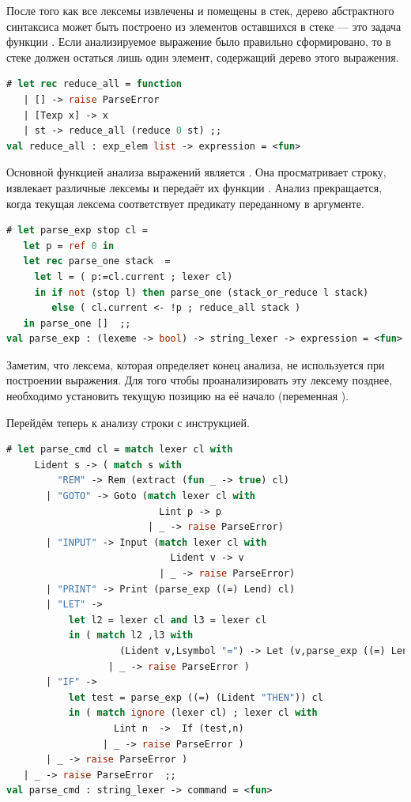 После того как все лексемы извлечены и помещены в стек, дерево абстрактного 
синтаксиса может быть построено из элементов оставшихся в стеке --- это задача 
функции . Если анализируемое выражение было правильно 
сформировано, то в стеке должен остаться лишь один элемент, содержащий дерево 
этого выражения.

\begin{lstlisting}[language=OCaml]
# let rec reduce_all = function
   | [] -> raise ParseError
   | [Texp x] -> x 
   | st -> reduce_all (reduce 0 st) ;;
val reduce_all : exp_elem list -> expression = <fun>
\end{lstlisting}

Основной функцией анализа выражений является . Она 
просматривает строку, извлекает различные лексемы и передаёт их функции 
. Анализ прекращается, когда текущая лексема 
соответствует предикату переданному в аргументе.

\begin{lstlisting}[language=OCaml]
# let parse_exp stop cl = 
   let p = ref 0 in 
   let rec parse_one stack  = 
     let l = ( p:=cl.current ; lexer cl)
     in if not (stop l) then parse_one (stack_or_reduce l stack)
        else ( cl.current <- !p ; reduce_all stack )
   in parse_one []  ;;
val parse_exp : (lexeme -> bool) -> string_lexer -> expression = <fun>
\end{lstlisting}

Заметим, что лексема, которая определяет конец анализа, не используется при 
построении выражения. Для того чтобы проанализировать эту лексему позднее, 
необходимо установить текущую позицию на её начало (переменная ).

Перейдём теперь к анализу строки с инструкцией.

\begin{lstlisting}[language=OCaml]
# let parse_cmd cl = match lexer cl with 
     Lident s -> ( match s with 
         "REM" -> Rem (extract (fun _ -> true) cl)
       | "GOTO" -> Goto (match lexer cl with 
                           Lint p -> p 
                         | _ -> raise ParseError)
       | "INPUT" -> Input (match lexer cl with 
                             Lident v -> v 
                           | _ -> raise ParseError)
       | "PRINT" -> Print (parse_exp ((=) Lend) cl)
       | "LET" -> 
           let l2 = lexer cl and l3 = lexer cl 
           in ( match l2 ,l3 with 
                    (Lident v,Lsymbol "=") -> Let (v,parse_exp ((=) Lend) cl)
                  | _ -> raise ParseError )
       | "IF" -> 
           let test = parse_exp ((=) (Lident "THEN")) cl 
           in ( match ignore (lexer cl) ; lexer cl with 
                   Lint n  ->  If (test,n) 
                 | _ -> raise ParseError )
       | _ -> raise ParseError ) 
   | _ -> raise ParseError  ;;
val parse_cmd : string_lexer -> command = <fun>
\end{lstlisting}

